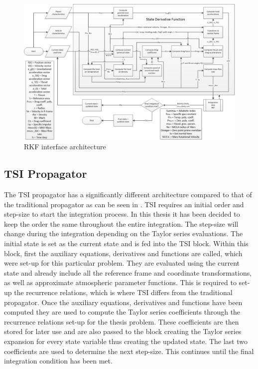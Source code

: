 \begin{figure}[!ht]
\centering
\includegraphics[width=1.5\textwidth, angle = 90]{figures/software/RK_Propagator.png}
\caption{\ac{RKF} interface architecture}
\label{fig:RK_Propagator}
\end{figure}


\subsection{\ac{TSI} Propagator}
\label{subsec:tsipropagator}
The \ac{TSI} propagator has a significantly different architecture compared to that of the traditional propagator as can be seen in . \ac{TSI} requires an initial order and step-size to start the integration process. In this thesis it has been decided to keep the order the same throughout the entire integration. The step-size will change during the integration depending on the Taylor series evaluations. The initial state is set as the current state and is fed into the \ac{TSI} block. Within this block, first the auxiliary equations, derivatives and functions are called, which were set-up for this particular problem. They are evaluated using the current state and already include all the reference frame and coordinate transformations, as well as approximate atmospheric parameter functions. This is required to set-up the recurrence relations, which is where \ac{TSI} differs from the traditional propagator. Once the auxiliary equations, derivatives and functions have been computed they are used to compute the Taylor series coefficients through the recurrence relations set-up for the thesis problem. These coefficients are then stored for later use and are also passed to the block creating the Taylor series expansion for every state variable thus creating the updated state. The last two coefficients are used to determine the next step-size. This continues until the final integration condition has been met. 


